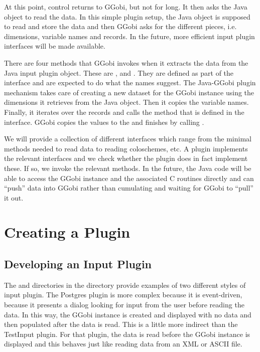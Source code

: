\documentclass{article}
\begin{document}
At this point, control returns to GGobi, but not for long. It then
asks the Java object to read the data.  In this simple plugin setup,
the Java object is supposed to read and store the data and then GGobi
asks for the different pieces, i.e.  dimensions, variable names and
records. In the future, more efficient input plugin interfaces
will be made available.

There are four methods that GGobi invokes when it extracts the data
from the Java input plugin object. These are ,
 and .  They are
defined as part of the  interface and are
expected to do what the names suggest.  The Java-GGobi plugin
mechanism takes care of creating a new dataset for the GGobi instance
using the dimensions it retrieves from the Java object.  Then it
copies the variable names.  Finally, it iterates over the records and
calls the  method that is defined in the
 interface.  GGobi copies the values to
the  and finishes by calling .

We will provide a collection of different interfaces which range from
the minimal methods needed to read data to reading coloschemes, etc.
A plugin implements the relevant interfaces and we check whether the
plugin does in fact implement these. If so, we invoke the relevant
methods.  In the future, the Java code will be able to access the
GGobi instance and the associated C routines directly and can ``push''
data into GGobi rather than cumulating and waiting for GGobi to
``pull'' it out.

\section{Creating a Plugin}

\subsection{Developing an Input Plugin}

The  and  directories in the
 directory provide examples of two different styles of
input plugin. The Postgres plugin is more complex because it is
event-driven, because it presents a dialog looking for input from the
user before reading the data.  In this way, the GGobi instance is
created and displayed with no data and then populated after the data
is read. This is a little more indirect than the TestInput plugin.
For that plugin, the data is read before the GGobi instance is
displayed and this behaves just like reading data from an XML or ASCII
file.
\end{document}
